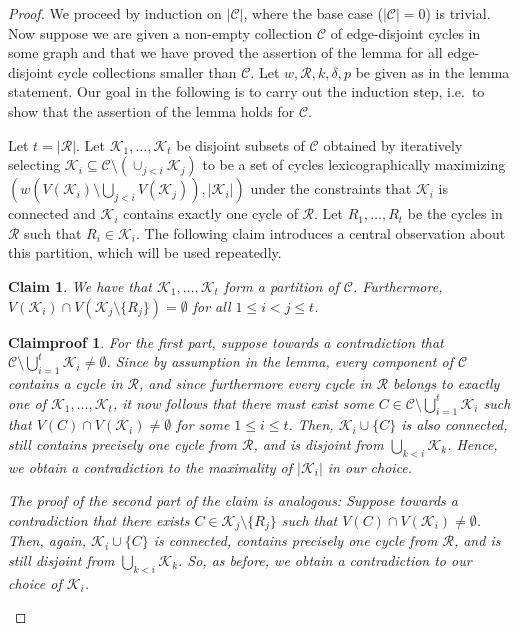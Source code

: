 \documentclass[10pt,a4paper]{amsart}
\newtheorem{claim}{Claim}
\newtheorem{claimproof}{Claimproof}
\begin{document}
\begin{proof}
     We proceed by induction on $|\mathcal C|$, where the base case ($|\mathcal C|=0$) is trivial. Now suppose we are given a non-empty collection $\mathcal{C}$ of edge-disjoint cycles in some graph and that we have proved the assertion of the lemma for all edge-disjoint cycle collections smaller than $\mathcal{C}$. Let $w,\mathcal{R},k,\delta,p$ be given as in the lemma statement. Our goal in the following is to carry out the induction step, i.e.\ to show that the assertion of the lemma holds for $\mathcal{C}$.

     Let $t=|\mathcal R|$. Let $\mathcal K_1,\ldots,\mathcal K_t$ be disjoint subsets of $\mathcal C$ obtained by iteratively selecting $\mathcal K_i\subseteq \mathcal C\setminus(\cup_{j<i}\mathcal K_j)$ to be a set of cycles lexicographically maximizing $(w(V(\mathcal K_i)\setminus \bigcup_{j<i}V(\mathcal{K}_j)),|\mathcal K_i|)$ under the constraints that $\mathcal K_i$ is connected and $\mathcal K_i$ contains exactly one cycle of $\mathcal R$. Let $R_1,\ldots, R_t$ be the cycles in $\mathcal R$ such that $R_i\in \mathcal K_i$. The following claim introduces a central observation about this partition, which will be used repeatedly.
     \begin{claim}\label{clm: disjointness}
     We have that $\mathcal{K}_1,\ldots,\mathcal{K}_t$ form a partition of $\mathcal C$. Furthermore,  $V(\mathcal K_i)\cap V(\mathcal K_j\setminus \{R_j\})=\emptyset$ for all $1\le i<j\le t$.
     \end{claim}
     \begin{claimproof}
For the first part, suppose towards a contradiction that $\mathcal C\setminus \bigcup_{i=1}^t \mathcal K_i\neq \emptyset$. Since by assumption in the lemma, every component of $\mathcal C$ contains a cycle in $\mathcal R$, and since furthermore every cycle in $\mathcal R$ belongs to exactly one of $\mathcal K_1,\ldots,\mathcal K_t$, it now follows that there must exist some $C\in \mathcal C\setminus \bigcup_{i=1}^t \mathcal K_i$ such that $V(C)\cap V(\mathcal K_i)\neq \emptyset$ for some $1\le i \le t$. Then, $\mathcal{K}_i\cup \{C\}$ is also connected, still contains precisely one cycle from $\mathcal R$, and is disjoint from $\bigcup_{k<i}\mathcal K_k$. Hence, we obtain a contradiction to the maximality of $|\mathcal K_i|$ in our choice. 

The proof of the second part of the claim is analogous:
 Suppose towards a contradiction that there exists $C\in \mathcal K_j\setminus\{R_j\}$ such that $V(C)\cap V(\mathcal K_i)\neq \emptyset$. Then, again, $\mathcal K_i\cup \{C\}$ is connected, contains precisely one cycle from $\mathcal{R}$, and is still disjoint from $\bigcup_{k<i}\mathcal{K}_k$. So, as before, we obtain a contradiction to our choice of $\mathcal{K}_i$.
     \end{claimproof}


\end{proof}
\end{document}
